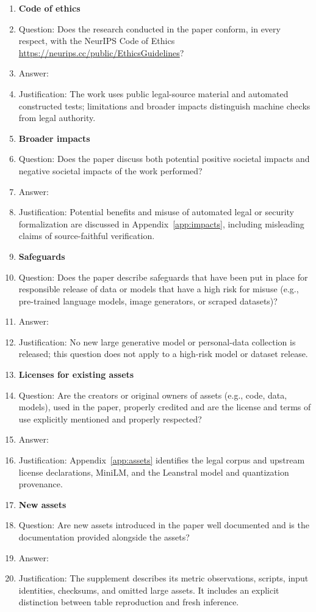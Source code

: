 \begin{enumerate}
\item {\bf Code of ethics}
    \item[] Question: Does the research conducted in the paper conform, in every respect, with the NeurIPS Code of Ethics \url{https://neurips.cc/public/EthicsGuidelines}?
    \item[] Answer: \answerYes{}
    \item[] Justification: The work uses public legal-source material and automated constructed tests; limitations and broader impacts distinguish machine checks from legal authority.


\item {\bf Broader impacts}
    \item[] Question: Does the paper discuss both potential positive societal impacts and negative societal impacts of the work performed?
    \item[] Answer: \answerYes{}
    \item[] Justification: Potential benefits and misuse of automated legal or security formalization are discussed in Appendix~\ref{app:impacts}, including misleading claims of source-faithful verification.
    
\item {\bf Safeguards}
    \item[] Question: Does the paper describe safeguards that have been put in place for responsible release of data or models that have a high risk for misuse (e.g., pre-trained language models, image generators, or scraped datasets)?
    \item[] Answer: \answerNA{}
    \item[] Justification: No new large generative model or personal-data collection is released; this question does not apply to a high-risk model or dataset release.

\item {\bf Licenses for existing assets}
    \item[] Question: Are the creators or original owners of assets (e.g., code, data, models), used in the paper, properly credited and are the license and terms of use explicitly mentioned and properly respected?
    \item[] Answer: \answerYes{}
    \item[] Justification: Appendix~\ref{app:assets} identifies the legal corpus and upstream license declarations, MiniLM, and the Leanstral model and quantization provenance.

\item {\bf New assets}
    \item[] Question: Are new assets introduced in the paper well documented and is the documentation provided alongside the assets?
    \item[] Answer: \answerYes{}
    \item[] Justification: The supplement describes its metric observations, scripts, input identities, checksums, and omitted large assets. It includes an explicit distinction between table reproduction and fresh inference.


\end{enumerate}
